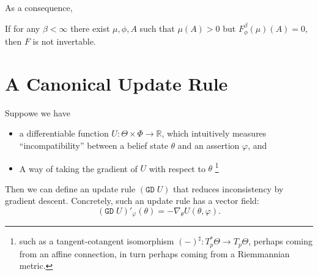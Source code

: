 \documentclass{article}
\begin{document}


As a consequence,
\begin{coro}
    If for any $\beta < \infty$ there exist $\mu, \phi, A$ such that
    $\mu(A) > 0$  but $F^{\beta}_\phi(\mu)(A) = 0$, then $F$ is not invertable.
\end{coro}


%

\section{A Canonical Update Rule}
Suppowe we have 
\begin{itemize}[nosep] 
    \item a differentiable function $U : \Theta \times \Phi  \to \mathbb R$, which intuitively measures ``incompatibility'' between a belief state $\theta$ and an assertion $\varphi$, and
    \item
        A way of taking the gradient of $U$ with respect to $\theta$%
            \footnote{
            such as a tangent-cotangent isomorphism $(-)^\sharp : T^*_p\Theta \to T_p \Theta$, perhaps coming from an affine connection, in turn perhaps coming from a Riemmannian metric.}
\end{itemize}

Then we can define an update rule $(\mathtt{GD}\; U)$ that reduces inconsistency by gradient descent. Concretely, such an update rule has a vector field:
\[
    (\mathtt{GD}\; U)'_\varphi(\theta) = - \nabla_\theta U(\theta,\varphi).
\]
\end{document}
